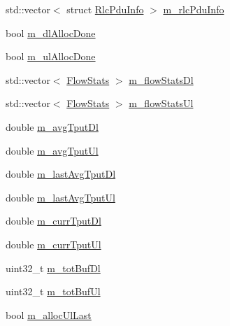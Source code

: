 \begin{DoxyCompactItemize}
\item 
std\+::vector$<$ struct \hyperlink{structns3_1_1RlcPduInfo}{Rlc\+Pdu\+Info} $>$ \hyperlink{structns3_1_1MmWaveFlexTtiPfMacScheduler_1_1UeSchedInfo_a31a4da55d3f66abfed8974afa2f1257b}{m\+\_\+rlc\+Pdu\+Info}
\item 
bool \hyperlink{structns3_1_1MmWaveFlexTtiPfMacScheduler_1_1UeSchedInfo_a0ae650fffcb20c11d03e4aa7ad6068ba}{m\+\_\+dl\+Alloc\+Done}
\item 
bool \hyperlink{structns3_1_1MmWaveFlexTtiPfMacScheduler_1_1UeSchedInfo_ac34dea2f17737457ac31049cef87b512}{m\+\_\+ul\+Alloc\+Done}
\item 
std\+::vector$<$ \hyperlink{structns3_1_1MmWaveFlexTtiPfMacScheduler_1_1FlowStats}{Flow\+Stats} $>$ \hyperlink{structns3_1_1MmWaveFlexTtiPfMacScheduler_1_1UeSchedInfo_aef12cebea6aaa482110a414127610d62}{m\+\_\+flow\+Stats\+Dl}
\item 
std\+::vector$<$ \hyperlink{structns3_1_1MmWaveFlexTtiPfMacScheduler_1_1FlowStats}{Flow\+Stats} $>$ \hyperlink{structns3_1_1MmWaveFlexTtiPfMacScheduler_1_1UeSchedInfo_a6f0227bbe084db1c7fdf51eb03157df8}{m\+\_\+flow\+Stats\+Ul}
\item 
double \hyperlink{structns3_1_1MmWaveFlexTtiPfMacScheduler_1_1UeSchedInfo_aff2da83e5e3947832ee9d74793d1d701}{m\+\_\+avg\+Tput\+Dl}
\item 
double \hyperlink{structns3_1_1MmWaveFlexTtiPfMacScheduler_1_1UeSchedInfo_a9b0aeda1c12db2aab5daa6e53ca4dc90}{m\+\_\+avg\+Tput\+Ul}
\item 
double \hyperlink{structns3_1_1MmWaveFlexTtiPfMacScheduler_1_1UeSchedInfo_a9637255c2a3ad122baa09a371d7f1c18}{m\+\_\+last\+Avg\+Tput\+Dl}
\item 
double \hyperlink{structns3_1_1MmWaveFlexTtiPfMacScheduler_1_1UeSchedInfo_a68c42673e3359b89647ae5e9d18beb8b}{m\+\_\+last\+Avg\+Tput\+Ul}
\item 
double \hyperlink{structns3_1_1MmWaveFlexTtiPfMacScheduler_1_1UeSchedInfo_aaec06c167ea7233845f222dee8d4fee1}{m\+\_\+curr\+Tput\+Dl}
\item 
double \hyperlink{structns3_1_1MmWaveFlexTtiPfMacScheduler_1_1UeSchedInfo_a12f628ab5bed0a895cfd2b58aa7b0484}{m\+\_\+curr\+Tput\+Ul}
\item 
uint32\+\_\+t \hyperlink{structns3_1_1MmWaveFlexTtiPfMacScheduler_1_1UeSchedInfo_a2c70d97d87231cba6992bb3134ee247b}{m\+\_\+tot\+Buf\+Dl}
\item 
uint32\+\_\+t \hyperlink{structns3_1_1MmWaveFlexTtiPfMacScheduler_1_1UeSchedInfo_a7463a285a2b5b7e988fc246d1f2c6494}{m\+\_\+tot\+Buf\+Ul}
\item 
bool \hyperlink{structns3_1_1MmWaveFlexTtiPfMacScheduler_1_1UeSchedInfo_aad4cf0c82dd05e57a065638166c9af0b}{m\+\_\+alloc\+Ul\+Last}
\end{DoxyCompactItemize}


